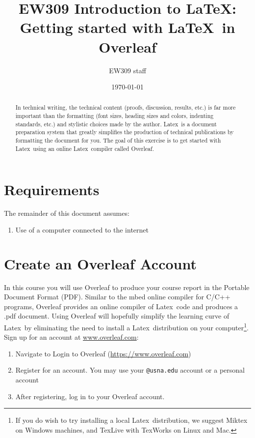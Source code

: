 \documentclass[10pt]{article}
\title{EW309 Introduction to \LaTeX: Getting started with \LaTeX\ in Overleaf}
\author{EW309 staff}
\date{\today}
\renewcommand{\LaTeX}{Latex}
\begin{document}
\maketitle 

\begin{abstract}
In technical writing, the technical content (proofs, discussion, results, etc.) is far more important than the formatting (font sizes, heading sizes and colors, indenting standards, etc.) and stylistic choices made by the author. \LaTeX\ is a document preparation system that greatly simplifies the production of technical publications by formatting the document for you. The goal of this exercise is to get started with \LaTeX\ using an online \LaTeX\ compiler called Overleaf. 
\end{abstract}

\section{Requirements}
The remainder of this document assumes:
\begin{enumerate}
\item Use of a computer connected to the internet
\end{enumerate}
    
\section{Create an Overleaf Account}
In this course you will use Overleaf to produce your course report in the Portable Document Format (PDF). Similar to the mbed online compiler for C/C++ programs, Overleaf provides an online compiler of \LaTeX\ code and produces a .pdf document. Using Overleaf will hopefully simplify the learning curve of \LaTeX\ by eliminating the need to install a \LaTeX\ distribution on your computer\footnote{If you do wish to try installing a local \LaTeX\ distribution, we suggest Miktex on Windows machines, and TexLive with TexWorks on Linux and Mac.}. Sign up for an account at \url{www.overleaf.com}:
\begin{enumerate}
\item Navigate to Login to Overleaf (\url{https://www.overleaf.com})
\item Register for an account. You may use your \lstinline{@usna.edu} account or a personal account
\item After registering, log in to your Overleaf account.
\end{enumerate}
    
\end{document}
